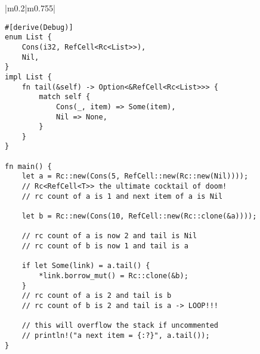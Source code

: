 \documentclass[main.tex,fontsize=8pt,paper=a4,paper=portrait,DIV=calc,]{scrartcl}
\begin{document}
\begin{table}[ht!]
\begin{tabular}{|m{0.2\linewidth}|m{0.755\linewidth}|}
\begin{lstlisting}
#[derive(Debug)]
enum List {
    Cons(i32, RefCell<Rc<List>>),
    Nil,
}
impl List {
    fn tail(&self) -> Option<&RefCell<Rc<List>>> {
        match self {
            Cons(_, item) => Some(item),
            Nil => None,
        }
    }
}

fn main() {
    let a = Rc::new(Cons(5, RefCell::new(Rc::new(Nil))));
    // Rc<RefCell<T>> the ultimate cocktail of doom!
    // rc count of a is 1 and next item of a is Nil

    let b = Rc::new(Cons(10, RefCell::new(Rc::clone(&a))));

    // rc count of a is now 2 and tail is Nil
    // rc count of b is now 1 and tail is a

    if let Some(link) = a.tail() {
        *link.borrow_mut() = Rc::clone(&b);
    }
    // rc count of a is 2 and tail is b  
    // rc count of b is 2 and tail is a -> LOOP!!!

    // this will overflow the stack if uncommented
    // println!("a next item = {:?}", a.tail());
}
\end{lstlisting}\\
\hline
\end{tabular}
\end{table}
\pagebreak
\end{document}
